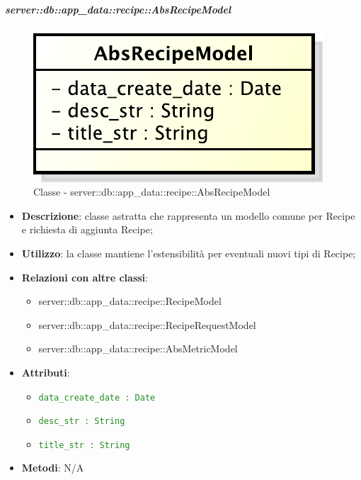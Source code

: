 		\subparagraph{server::db::app\_data::recipe::AbsRecipeModel} %
		\label{subp:server_db_app_data_recipe_absrecipemodel}
			\begin{figure}[htbp]
				\centering
				\centerline{\includegraphics[scale=0.75]{./images/server/classes/db/abs_recipe_model.pdf}}
				\caption{Classe - server::db::app\_data::recipe::AbsRecipeModel}
			\end{figure}
			\begin{itemize}
				\item \textbf{Descrizione}: classe astratta che rappresenta un modello comune per Recipe e richiesta di aggiunta Recipe;
				\item \textbf{Utilizzo}: la classe mantiene l'estensibilità per eventuali nuovi tipi di Recipe;
				\item \textbf{Relazioni con altre classi}:
					\begin{itemize}
						\item server::db::app\_data::recipe::RecipeModel
						\item server::db::app\_data::recipe::RecipeRequestModel
						\item server::db::app\_data::recipe::AbsMetricModel
					\end{itemize}
				\item \textbf{Attributi}:
					\begin{itemize}
						\item \textcolor{forestgreen}{\texttt{data\_create\_date : Date}}
						\item \textcolor{forestgreen}{\texttt{desc\_str : String}}
						\item \textcolor{forestgreen}{\texttt{title\_str : String}}
					\end{itemize}
				\item \textbf{Metodi}: N/A
			\end{itemize}


